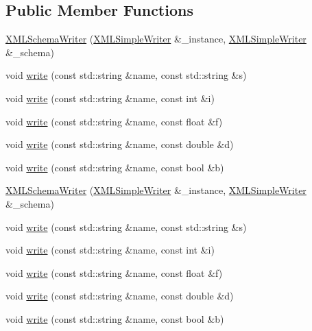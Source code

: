 \subsection*{Public Member Functions}
\begin{DoxyCompactItemize}
\item 
\mbox{\hyperlink{classXMLWriterAPI_1_1XMLSchemaWriter_a2284f6d1214940974d547c380e1ecfc8}{X\+M\+L\+Schema\+Writer}} (\mbox{\hyperlink{classXMLWriterAPI_1_1XMLSimpleWriter}{X\+M\+L\+Simple\+Writer}} \&\+\_\+instance, \mbox{\hyperlink{classXMLWriterAPI_1_1XMLSimpleWriter}{X\+M\+L\+Simple\+Writer}} \&\+\_\+schema)
\item 
void \mbox{\hyperlink{classXMLWriterAPI_1_1XMLSchemaWriter_a1922edfcbb9d52c70949fd8c8dd97569}{write}} (const std\+::string \&name, const std\+::string \&s)
\item 
void \mbox{\hyperlink{classXMLWriterAPI_1_1XMLSchemaWriter_a1b951af62e2106b76e33022c0f1b5d88}{write}} (const std\+::string \&name, const int \&i)
\item 
void \mbox{\hyperlink{classXMLWriterAPI_1_1XMLSchemaWriter_affbcfbac63240a8048b6b0940cc05c30}{write}} (const std\+::string \&name, const float \&f)
\item 
void \mbox{\hyperlink{classXMLWriterAPI_1_1XMLSchemaWriter_aaa0138613c826e77a63e5195bc742f07}{write}} (const std\+::string \&name, const double \&d)
\item 
void \mbox{\hyperlink{classXMLWriterAPI_1_1XMLSchemaWriter_a0d6bf66ccbb217c4db704568f9c377fe}{write}} (const std\+::string \&name, const bool \&b)
\item 
\mbox{\hyperlink{classXMLWriterAPI_1_1XMLSchemaWriter_a2284f6d1214940974d547c380e1ecfc8}{X\+M\+L\+Schema\+Writer}} (\mbox{\hyperlink{classXMLWriterAPI_1_1XMLSimpleWriter}{X\+M\+L\+Simple\+Writer}} \&\+\_\+instance, \mbox{\hyperlink{classXMLWriterAPI_1_1XMLSimpleWriter}{X\+M\+L\+Simple\+Writer}} \&\+\_\+schema)
\item 
void \mbox{\hyperlink{classXMLWriterAPI_1_1XMLSchemaWriter_a1922edfcbb9d52c70949fd8c8dd97569}{write}} (const std\+::string \&name, const std\+::string \&s)
\item 
void \mbox{\hyperlink{classXMLWriterAPI_1_1XMLSchemaWriter_a1b951af62e2106b76e33022c0f1b5d88}{write}} (const std\+::string \&name, const int \&i)
\item 
void \mbox{\hyperlink{classXMLWriterAPI_1_1XMLSchemaWriter_affbcfbac63240a8048b6b0940cc05c30}{write}} (const std\+::string \&name, const float \&f)
\item 
void \mbox{\hyperlink{classXMLWriterAPI_1_1XMLSchemaWriter_aaa0138613c826e77a63e5195bc742f07}{write}} (const std\+::string \&name, const double \&d)
\item 
void \mbox{\hyperlink{classXMLWriterAPI_1_1XMLSchemaWriter_a0d6bf66ccbb217c4db704568f9c377fe}{write}} (const std\+::string \&name, const bool \&b)
\end{DoxyCompactItemize}



